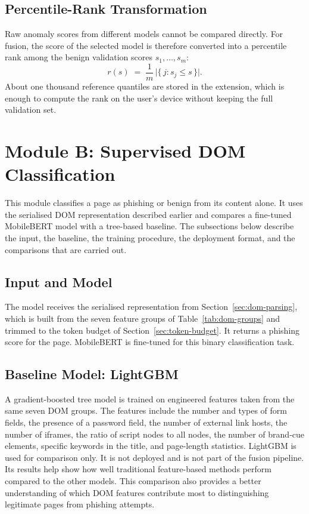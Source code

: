 \documentclass{FastFyp}
\begin{document}
\subsection{Percentile-Rank Transformation}
Raw anomaly scores from different models cannot be compared directly. For fusion, the score of the selected model is therefore converted into a percentile rank among the benign validation scores $s_1,\dots,s_m$:
\begin{equation}
r(s) \;=\; \frac{1}{m}\,\bigl|\{\,j : s_j \le s\,\}\bigr| .
\end{equation}
About one thousand reference quantiles are stored in the extension, which is enough to compute the rank on the user's device without keeping the full validation set.

\section{Module B: Supervised DOM Classification}
\label{sec:dom-module}
This module classifies a page as phishing or benign from its content alone. It uses the serialised DOM representation described earlier and compares a fine-tuned MobileBERT model with a tree-based baseline. The subsections below describe the input, the baseline, the training procedure, the deployment format, and the comparisons that are carried out.

\subsection{Input and Model}
The model receives the serialised representation from Section~\ref{sec:dom-parsing}, which is built from the seven feature groups of Table~\ref{tab:dom-groups} and trimmed to the token budget of Section~\ref{sec:token-budget}. It returns a phishing score for the page. MobileBERT is fine-tuned for this binary classification task.

\subsection{Baseline Model: LightGBM}
A gradient-boosted tree model is trained on engineered features taken from the same seven DOM groups. The features include the number and types of form fields, the presence of a password field, the number of external link hosts, the number of iframes, the ratio of script nodes to all nodes, the number of brand-cue elements, specific keywords in the title, and page-length statistics. LightGBM is used for comparison only. It is not deployed and is not part of the fusion pipeline. Its results help show how well traditional feature-based methods perform compared to the other models. This comparison also provides a better understanding of which DOM features contribute most to distinguishing legitimate pages from phishing attempts.
\end{document}
